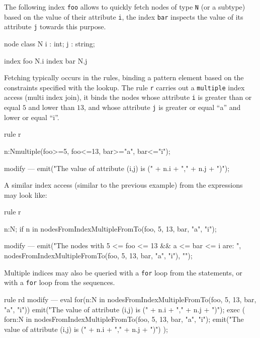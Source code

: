 \begin{example}
The following index \texttt{foo} allows to quickly fetch nodes of type \texttt{N} (or a subtype) based on the value of their attribute \texttt{i}, the index \texttt{bar} inspects the value of its attribute \texttt{j} towards this purpose.

\begin{grgen}
node class N
{
  i : int;
  j : string;
}

index foo { N.i }
index bar { N.j }
\end{grgen}

Fetching typically occurs in the rules, binding a pattern element based on the constraints specified with the lookup.
The rule \texttt{r} carries out a \texttt{multiple} index access (multi index join), it binds the nodes whose attribute \texttt{i} is greater than or equal $5$ and lower than $13$, and whose attribute \texttt{j} is greater or equal "`a"' and lower or equal "`i"'.

\begin{grgen}
rule r {
  n:N{multiple(foo>=5, foo<=13, bar>="a", bar<="i")};

  modify {
  ---
    emit("The value of attribute (i,j) is (" + n.i + "," + n.j + ")\n");
  }
}
\end{grgen}

\end{example}

\begin{example}

A similar index access (similar to the previous example) from the expressions may look like:

\begin{grgen}
rule r {
  n:N;
  if { n in nodesFromIndexMultipleFromTo(foo, 5, 13, bar, "a", "i"); }

  modify {
  ---
    emit("The nodes with 5 <= foo <= 13 && a <= bar <= i are: ", nodesFromIndexMultipleFromTo(foo, 5, 13, bar, "a", "i"), "\n");
  }
}
\end{grgen}

Multiple indices may also be queried with a \texttt{for} loop from the statements, or with a \texttt{for} loop from the sequences.

\begin{grgen}
rule rd {
  modify {
  ---
    eval {
      for(n:N in nodesFromIndexMultipleFromTo(foo, 5, 13, bar, "a", "i")) {
        emit("The value of attribute (i,j) is (" + n.i + "," + n.j + ")\n");
      }
    }
    exec (
      for{n:N in nodesFromIndexMultipleFromTo(foo, 5, 13, bar, "a", "i");
        { emit("The value of attribute (i,j) is (" + n.i + "," + n.j + ")\n") }
      }
    );
  }
}
\end{grgen}

\end{example}


